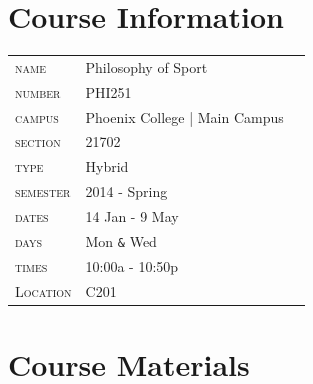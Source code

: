 \documentclass{tufte-handout}
\begin{document}
\section{Course Information}\label{sec:course}


\begin{center}
\begin{tabular}{lll}
  \rowcolor{red}
  \textsc{name} & Philosophy of Sport\\
  \rowcolor{lightred}
  \textsc{number} & PHI251\\
  \rowcolor{red}
  \textsc{campus} & Phoenix College | Main Campus\\
  \rowcolor{lightred}
  \textsc{section} & 21702 \\
  \rowcolor{red}
  \textsc{type} & Hybrid \\ 
  \rowcolor{lightred}
  \textsc{semester} & 2014 - Spring\\
  \rowcolor{red}
  \textsc{dates} & 14 Jan - 9 May\\
  \rowcolor{lightred}
  \textsc{days} & Mon \Verb|&| Wed\\ 
  \rowcolor{red}
  \textsc{times} & 10:00a - 10:50p \\ 
  \rowcolor{lightred}
  \textsc{Location} & C201\\ 
\end{tabular}
\end{center}

\newpage

\section{Course Materials}
\end{document}
